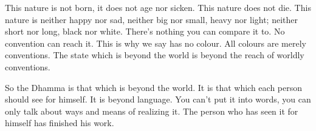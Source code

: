 This nature is not born, it does not age nor sicken. This nature does not die. This nature is neither happy nor sad, neither big nor small, heavy nor light; neither short nor long, black nor white. There's nothing you can compare it to. No convention can reach it. This is why we say  has no colour. All colours are merely conventions. The state which is beyond the world is beyond the reach of worldly conventions. 

So the Dhamma is that which is beyond the world. It is that which each person should see for himself. It is beyond language. You can't put it into words, you can only talk about ways and means of realizing it. The person who has seen it for himself has finished his work. 

